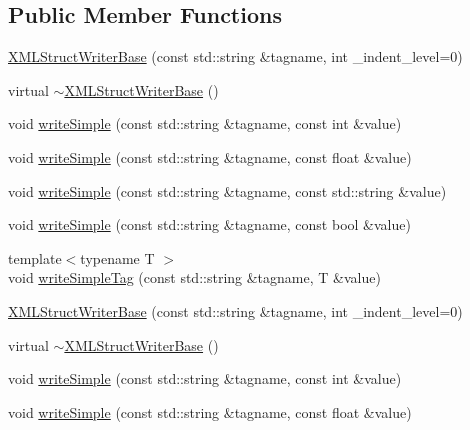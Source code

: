 \subsection*{Public Member Functions}
\begin{DoxyCompactItemize}
\item 
\mbox{\hyperlink{classXMLStructWriterAPI_1_1XMLStructWriterBase_a502490c6d71df950eb4ffa61388c12e9}{X\+M\+L\+Struct\+Writer\+Base}} (const std\+::string \&tagname, int \+\_\+indent\+\_\+level=0)
\item 
virtual \mbox{\hyperlink{classXMLStructWriterAPI_1_1XMLStructWriterBase_aef1865b8b39ea8001e84d05a06be0129}{$\sim$\+X\+M\+L\+Struct\+Writer\+Base}} ()
\item 
void \mbox{\hyperlink{classXMLStructWriterAPI_1_1XMLStructWriterBase_a53065b03f0749669f9ed62f6e0875fa4}{write\+Simple}} (const std\+::string \&tagname, const int \&value)
\item 
void \mbox{\hyperlink{classXMLStructWriterAPI_1_1XMLStructWriterBase_a521a493ac0656d33d06f4bb74286de6c}{write\+Simple}} (const std\+::string \&tagname, const float \&value)
\item 
void \mbox{\hyperlink{classXMLStructWriterAPI_1_1XMLStructWriterBase_a32cd25bd69861a05001bb31c5ad9eefe}{write\+Simple}} (const std\+::string \&tagname, const std\+::string \&value)
\item 
void \mbox{\hyperlink{classXMLStructWriterAPI_1_1XMLStructWriterBase_a8e5e47c565c73791739d298b697d66f8}{write\+Simple}} (const std\+::string \&tagname, const bool \&value)
\item 
{\footnotesize template$<$typename T $>$ }\\void \mbox{\hyperlink{classXMLStructWriterAPI_1_1XMLStructWriterBase_a049c80e79c8f64d2b6b0221c01392d37}{write\+Simple\+Tag}} (const std\+::string \&tagname, T \&value)
\item 
\mbox{\hyperlink{classXMLStructWriterAPI_1_1XMLStructWriterBase_a502490c6d71df950eb4ffa61388c12e9}{X\+M\+L\+Struct\+Writer\+Base}} (const std\+::string \&tagname, int \+\_\+indent\+\_\+level=0)
\item 
virtual \mbox{\hyperlink{classXMLStructWriterAPI_1_1XMLStructWriterBase_aef1865b8b39ea8001e84d05a06be0129}{$\sim$\+X\+M\+L\+Struct\+Writer\+Base}} ()
\item 
void \mbox{\hyperlink{classXMLStructWriterAPI_1_1XMLStructWriterBase_a53065b03f0749669f9ed62f6e0875fa4}{write\+Simple}} (const std\+::string \&tagname, const int \&value)
\item 
void \mbox{\hyperlink{classXMLStructWriterAPI_1_1XMLStructWriterBase_a521a493ac0656d33d06f4bb74286de6c}{write\+Simple}} (const std\+::string \&tagname, const float \&value)

\end{DoxyCompactItemize}

